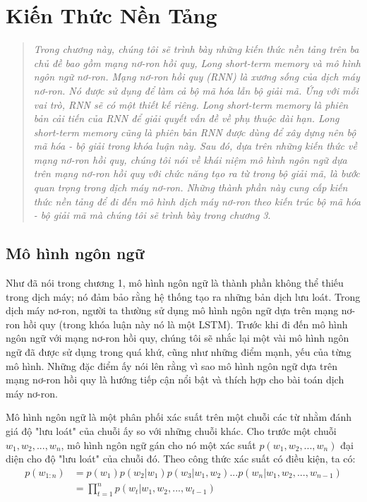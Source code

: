 \chapter{Kiến Thức Nền Tảng}
\ifpdf
    \graphicspath{{Chapter2/Chapter2Figs/PNG/}{Chapter2/Chapter2Figs/PDF/}{Chapter2/Chapter2Figs/}}
\else
    \graphicspath{{Chapter2/Chapter2Figs/EPS/}{Chapter2/Chapter2Figs/}}
\fi

\begin{quote}

\textit{Trong chương này, chúng tôi sẽ trình bày những kiến thức nền tảng trên ba chủ đề bao gồm mạng nơ-ron hồi quy, Long short-term memory và mô hình ngôn ngữ nơ-ron. Mạng nơ-ron hồi quy (RNN) là xương sống của dịch máy nơ-ron. Nó được sử dụng để làm cả bộ mã hóa lẫn bộ giải mã. Ứng với mỗi vai trò, RNN sẽ có một thiết kế riêng. Long short-term memory là phiên bản cải tiến của RNN để giải quyết vấn đề về phụ thuộc dài hạn. Long short-term memory cũng là phiên bản RNN được dùng để xây dựng nên bộ mã hóa - bộ giải trong khóa luận này. Sau đó, dựa trên những kiến thức về mạng nơ-ron hồi quy, chúng tôi nói về khái niệm mô hình ngôn ngữ dựa trên mạng nơ-ron hồi quy với chức năng tạo ra từ trong bộ giải mã, là bước quan trọng trong dịch máy nơ-ron. Những thành phần này cung cấp kiến thức nền tảng để đi đến mô hình dịch máy nơ-ron theo kiến trúc bộ mã hóa - bộ giải mã mà chúng tôi sẽ trình bày trong chương 3}.

\end{quote}


\section{Mô hình ngôn ngữ}

Như đã nói trong chương 1, mô hình ngôn ngữ là thành phần không thể thiếu trong dịch máy; nó đảm bảo rằng hệ thống tạo ra những bản dịch lưu loát. Trong dịch máy nơ-ron, người ta thường sử dụng mô hình ngôn ngữ dựa trên mạng nơ-ron hồi quy (trong khóa luận này nó là một LSTM). Trước khi đi đến mô hình ngôn ngữ với mạng nơ-ron hồi quy, chúng tôi sẽ nhắc lại một vài mô hình ngôn ngữ đã được sử dụng trong quá khứ, cũng như những điểm mạnh, yếu của từng mô hình. Những đặc điểm ấy nói lên rằng vì sao mô hình ngôn ngữ dựa trên mạng nơ-ron hồi quy là hướng tiếp cận nổi bật và thích hợp cho bài toán dịch máy nơ-ron.

Mô hình ngôn ngữ là một phân phối xác suất trên một chuỗi các từ nhằm đánh giá độ "lưu loát" của chuỗi ấy so với những chuỗi khác. Cho trước một chuỗi $w_1,w_2,...,w_n$, mô hình ngôn ngữ gán cho nó một xác suất $p(w_1,w_2,...,w_n)$ đại diện cho độ "lưu loát" của chuỗi đó. Theo công thức xác suất có điều kiện, ta có:
\begin{equation} \label{traditionalLM}
\begin{split}
	p(w_{1:n}) &= p(w_1)p(w_2|w_1)p(w_3|w_1,w_2)...p(w_n|w_1,w_2,...,w_{n-1}) \\
				&= \prod_{t=1}^{n} p(w_t|w_1,w_2,...,w_{t-1})
\end{split}
\end{equation}
 
